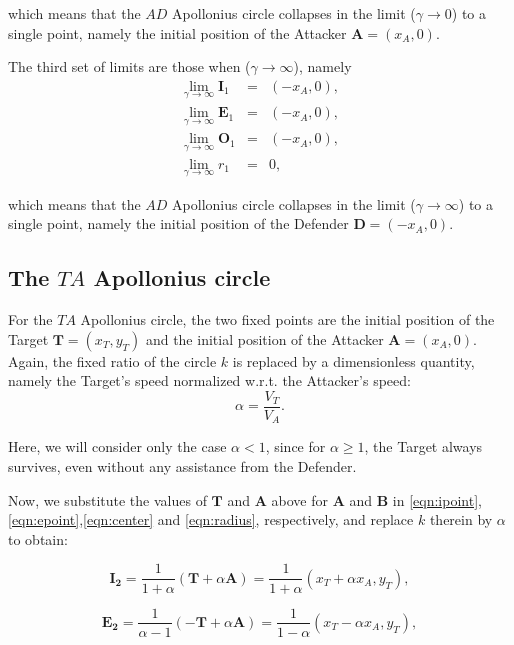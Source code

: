 \documentclass[final,5p,times,twocolumn]{elsarticle}
\begin{document}
which means that the $AD$ Apollonius circle collapses in the limit ($\gamma\to0$) to a single point, namely the initial position of the Attacker $\boldsymbol{A}=(x_A,0)$.

The third set of limits are those when ($\gamma\to\infty$), namely
\begin{eqnarray}
\lim_{\gamma\to\infty} \boldsymbol{I}_1 &=& (-x_A,0), \\
\lim_{\gamma\to\infty} \boldsymbol{E}_1 &=& (-x_A,0),\\
\lim_{\gamma\to\infty} \boldsymbol{O}_1 &=& (-x_A,0),\\
\lim_{\gamma\to\infty} r_1 &=& 0,
\end{eqnarray}

which means that the $AD$ Apollonius circle collapses in the limit ($\gamma\to\infty$) to a single point, namely the initial position of the Defender $\boldsymbol{D}=(-x_A,0)$.

\subsection{The $TA$ Apollonius circle}
For the $TA$ Apollonius circle, the two fixed points are the initial position of the Target $\boldsymbol{T}=(x_{T},y_{T})$ and the initial position of the Attacker  $\boldsymbol{A}=(x_{A},0)$.
Again, the fixed ratio of the circle $k$ is replaced by a dimensionless quantity, namely the Target's speed normalized w.r.t. the Attacker's speed: 
\begin{equation}
\alpha= \dfrac{V_{T}}{V_{A}}.
\end{equation}

Here, we will consider only the case $\alpha <1$, since for $\alpha\geqslant1$, the Target always survives, even without any assistance from the Defender.

Now, we substitute the values of $\boldsymbol{T}$ and $\boldsymbol{A}$ above for $\boldsymbol{A}$ and $\boldsymbol{B}$ in \eqref{eqn:ipoint},\eqref{eqn:epoint},\eqref{eqn:center} and \eqref{eqn:radius}, respectively, and replace $k$ therein by $\alpha$ to obtain:

\begin{equation}
\boldsymbol{I_{2}} =\dfrac{1}{1+\alpha}(\boldsymbol{T}+\alpha \boldsymbol{A}) =\dfrac{1}{1+\alpha}(x_{T}+\alpha x_{A},y_{T}),
\end{equation}

\begin{equation}
\boldsymbol{E_{2}} =\dfrac{1}{\alpha-1}(-\boldsymbol{T}+\alpha \boldsymbol{A}) =\dfrac{1}{1-\alpha}(x_{T}-\alpha x_{A},y_{T}),
\end{equation}
\end{document}
